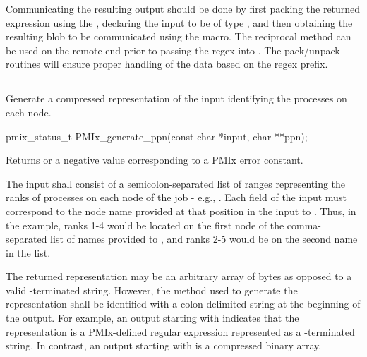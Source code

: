 Communicating the resulting output should be done by first packing the returned expression using the , declaring the input to be of type , and then obtaining the resulting blob to be communicated using the  macro. The reciprocal method can be used on the remote end prior to passing the regex into . The pack/unpack routines will ensure proper handling of the data based on the regex prefix.
\advicermend


\subsection{}

\summary

Generate a compressed representation of the input identifying the processes on each node.

\format

\cspecificstart
\begin{codepar}
pmix_status_t
PMIx_generate_ppn(const char *input, char **ppn);
\end{codepar}
\cspecificend

\begin{arglist}
\end{arglist}

Returns  or a negative value corresponding to a PMIx error constant.

\descr

The input shall consist of a semicolon-separated list of ranges representing the ranks of processes on each node of the job - e.g., . Each field of the input must correspond to the node name provided at that position in the input to . Thus, in the example, ranks 1-4 would be located on the first node of the comma-separated list of names provided to , and ranks 2-5 would be on the second name in the list.

\advicermstart
The returned representation may be an arbitrary array of bytes as opposed to a valid -terminated string. However, the method used to generate the representation shall be identified with a colon-delimited string at the beginning of the output. For example, an output starting with  indicates that the representation is a \ac{PMIx}-defined regular expression represented as a -terminated string. In contrast, an output starting with  is a compressed binary array.

